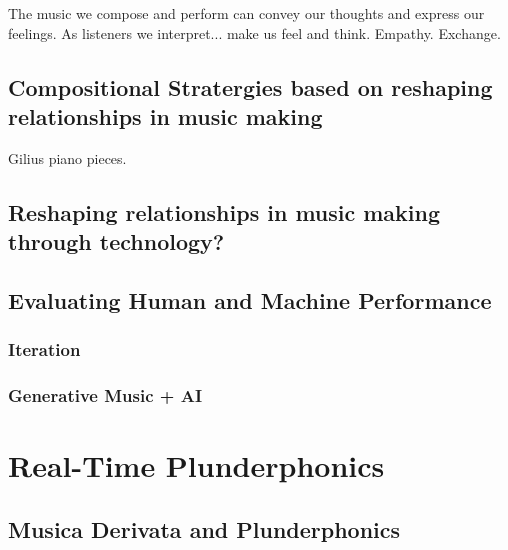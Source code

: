 The music we compose and perform can convey our thoughts and express our feelings. As listeners we interpret... make us feel and think. Empathy. Exchange.  

\subsection{Compositional Stratergies based on reshaping relationships in music making}

Gilius piano pieces.

\subsection{Reshaping relationships in music making through technology?}

\subsection{Evaluating Human and Machine Performance}
\subsubsection {Iteration}
\subsubsection {Generative Music + AI}

\section{Real-Time Plunderphonics}

\subsection{Musica Derivata and Plunderphonics}

